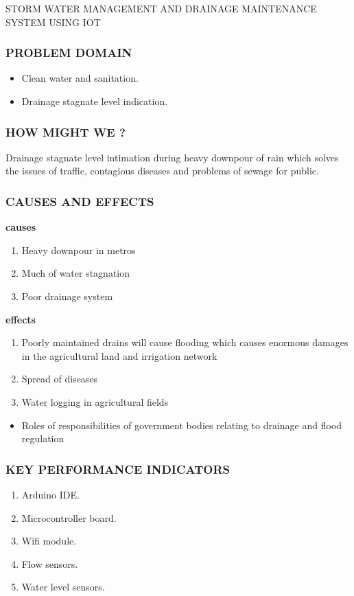 \documentclass{beamer}
\begin{document}
\begin{frame}
\begin{center}
STORM WATER MANAGEMENT AND DRAINAGE  MAINTENANCE  SYSTEM  USING  IOT
\end{center}
\end{frame}
\begin{frame}
\frametitle{PROBLEM DOMAIN}
\begin{itemize}
\item Clean water and sanitation.
\item Drainage stagnate level indication.
\end{itemize}
\end{frame}
\begin{frame}
\frametitle{HOW MIGHT WE ?}
Drainage stagnate level intimation during heavy downpour of rain which solves the issues of traffic, contagious diseases and problems of sewage for public.
\end{frame}
\begin{frame}
\frametitle{CAUSES AND EFFECTS}
\textbf{causes}
\begin{enumerate}
\item Heavy downpour in metros
\item Much of water stagnation
\item Poor drainage system
\end{enumerate} 
\textbf{effects}
\begin{enumerate}


\item Poorly maintained drains will cause flooding which causes enormous   
  damages in the agricultural land and irrigation network
\item Spread of diseases
\item Water logging in agricultural fields
\end{enumerate}
\end{frame}
\begin{frame}
\begin{itemize}
\frametitle{STAKEHOLDER}
\item Roles of responsibilities of government bodies relating to drainage and  flood regulation
\end{itemize}
\end{frame}
\begin{frame}
\frametitle{KEY PERFORMANCE INDICATORS}
\begin{enumerate}
\item Arduino IDE.
\item Microcontroller board.
\item Wifi module.
\item Flow sensors.
\item Water level sensors.
\end{enumerate}
\end{frame}
\end{document}
